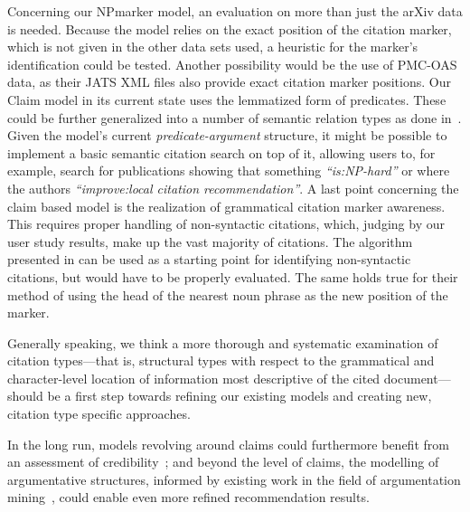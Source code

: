 Concerning our NPmarker model, an evaluation on more than just the arXiv data is needed. Because the model relies on the exact position of the citation marker, which is not given in the other data sets used, a heuristic for the marker's identification could be tested. Another possibility would be the use of PMC-OAS data, as their JATS XML files also provide exact citation marker positions. Our Claim model in its current state uses the lemmatized form of predicates. These could be further generalized into a number of semantic relation types as done in~\cite{Gabor2018}. Given the model's current \emph{predicate-argument} structure, it might be possible to implement a basic semantic citation search on top of it, allowing users to, for example, search for publications showing that something \emph{``is:NP-hard''} or where the authors \emph{``improve:local citation recommendation''}. A last point concerning the claim based model is the realization of grammatical citation marker awareness. This requires proper handling of non-syntactic citations, which, judging by our user study results, make up the vast majority of citations. The algorithm presented in \cite{Abujbara2012} can be used as a starting point for identifying non-syntactic citations, but would have to be properly evaluated. The same holds true for their method of using the head of the nearest noun phrase as the new position of the marker.

Generally speaking, we think a more thorough and systematic examination of citation types---that is, structural types with respect to the grammatical and character-level location of information most descriptive of the cited document---should be a first step towards refining our existing models and creating new, citation type specific approaches.

In the long run, models revolving around claims could furthermore benefit from an assessment of credibility~\cite{Popat2016}; and beyond the level of claims, the modelling of argumentative structures, informed by existing work in the field of argumentation mining~\cite{Stab2016,Lippi2016,Habernal2017}, could enable even more refined recommendation results.
